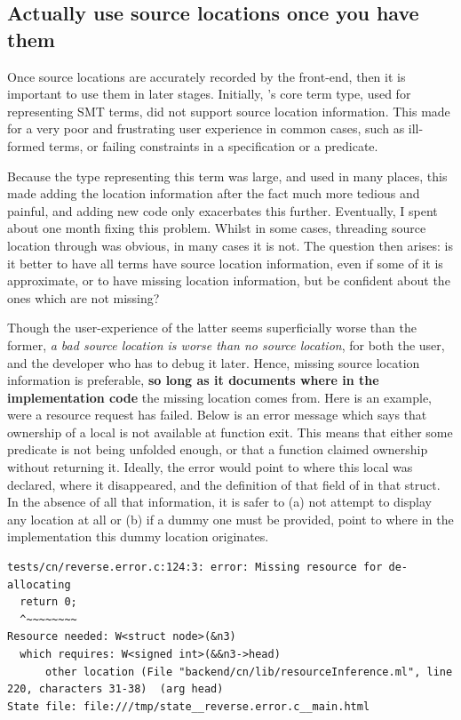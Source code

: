 \subsection{Actually use source locations once you have them}

Once source locations are accurately recorded by the front-end, then it is
important to use them in later stages. Initially, 's core term type,
used for representing SMT terms, did not support source location information.
This made for a very poor and frustrating user experience in common cases, such
as ill-formed terms, or failing constraints in a specification or a predicate.

Because the type representing this term was large, and used in many places,
this made adding the location information after the fact much more tedious and
painful, and adding new code only exacerbates this further. Eventually, I spent
about one month fixing this
problem.
Whilst in some cases, threading source location through was obvious,
in many cases it is not. The question then arises: is it better to have all
terms have source location information, even if some of it is approximate,
or to have missing location information, but be confident about the ones
which are not missing?

Though the user-experience of the latter seems superficially worse than the
former, \emph{a bad source location is worse than no source location}, for both
the user, and the developer who has to debug it later. Hence, missing source
location information is preferable, \textbf{so long as it documents where in
the implementation code} the missing location comes from. Here is an example,
were a resource request has failed. Below is an error message which says that
ownership of a local is not available at function exit. This means that either
some predicate is not being unfolded enough, or that a function claimed
ownership without returning it. Ideally, the error would point to where this
local was declared, where it disappeared, and the definition of that field of
in that struct. In the absence of all that information, it is safer to (a) not
attempt to display any location at all or (b) if a dummy one must be provided,
point to where in the implementation this dummy location originates.

\begin{verbatim}
tests/cn/reverse.error.c:124:3: error: Missing resource for de-allocating
  return 0;
  ^~~~~~~~~
Resource needed: W<struct node>(&n3)
  which requires: W<signed int>(&&n3->head)
      other location (File "backend/cn/lib/resourceInference.ml", line 220, characters 31-38)  (arg head)
State file: file:///tmp/state__reverse.error.c__main.html
\end{verbatim}


